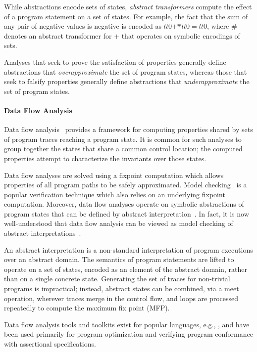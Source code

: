 While abstractions encode sets of states, \textit{abstract transformers}
compute the effect of a program statement on a set of states.  For example,
the fact that the sum of any pair of negative values is negative is
encoded as $lt0 +^\# lt0 = lt0$, where $\#$ denotes an abstract transformer
for $+$ that operates on symbolic encodings of sets.

Analyses that seek to prove the satisfaction of properties generally
define abstractions that \textit{overapproximate} the set of program
states, whereas those that seek to falsify properties generally define
abstractions that \textit{underapproximate} the set of program states.

\paragraph{Data Flow Analysis}
Data flow analysis~\cite{kildall1973unified} 
provides a framework for computing properties shared by sets of
program traces reaching a program state.  It is
common for such analyses to group together the states that share a
common control location; the computed properties attempt to characterize
the invariants over those states.

Data flow analyses are solved using a fixpoint computation which
allows properties of all program paths to be safely approximated.
Model checking~\cite{clarke1999model} is a popular verification technique
which also relies on an underlying
fixpoint computation.  Moreover, data flow
analyses operate on symbolic abstractions of program states that
can be defined by abstract interpretation~\cite{cousot1977abstract}. 
In fact, it is now well-understood that data flow analysis can be
viewed as model checking of abstract interpretations~\cite{schmidt1998data}.

An abstract interpretation is a 
non-standard interpretation of program executions over an abstract domain.  
The semantics of program statements are lifted to operate
on a set of states, encoded as an element of the abstract domain,
rather than on a single concrete state.  
Generating the set of traces for non-trivial programs is impractical;
instead, abstract states can be combined, via a meet operation, wherever
traces merge in the control flow, and loops are processed
repeatedly to compute the maximum fix point (MFP).

Data flow analysis tools and toolkits exist for popular 
languages, e.g., \cite{vallee1999soot,fink2012wala,Lattner:2004:LLVM},
and have been used primarily for program optimization and
verifying program conformance with assertional specifications.

